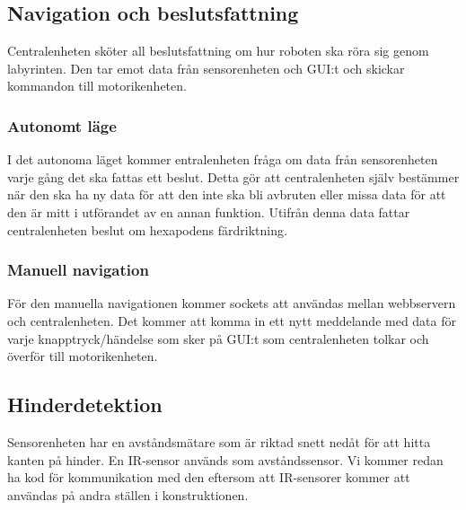 \documentclass[a4paper,titlepage,12pt]{article}
\begin{document}
	\subsection{Navigation och beslutsfattning}

	Centralenheten sköter all beslutsfattning om hur roboten ska röra sig
	genom labyrinten. Den tar emot data från sensorenheten och GUI:t och
	skickar kommandon till motorikenheten.
  
	\subsubsection{Autonomt läge}
	I det autonoma läget kommer entralenheten fråga om data från sensorenheten
    varje gång det ska fattas ett beslut. Detta gör att centralenheten själv
    bestämmer när den ska ha ny data för att den inte ska bli avbruten eller missa
    data för att den är mitt i utförandet av en annan funktion. Utifrån denna data
    fattar centralenheten beslut om hexapodens färdriktning.

    \subsubsection{Manuell navigation}
    För den manuella navigationen kommer sockets att användas mellan webbservern
    och centralenheten. Det kommer att komma in ett nytt meddelande med data för varje
    knapptryck/händelse som sker på GUI:t som centralenheten tolkar och överför
    till motorikenheten. 

	\subsection{Hinderdetektion}
	Sensorenheten har en avståndsmätare som är riktad snett nedåt för att hitta kanten 
	på hinder. En IR-sensor används som avståndssensor. Vi kommer redan ha  kod för kommunikation med
	den  eftersom att IR-sensorer kommer att användas på andra ställen i konstruktionen. 
	
\end{document}
